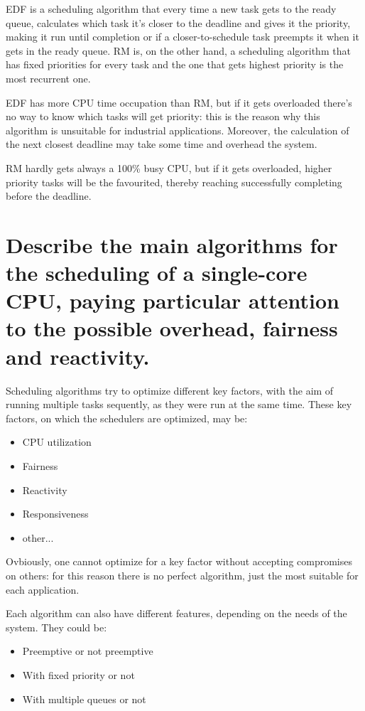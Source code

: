 EDF is a scheduling algorithm that every time a new task gets to the ready queue, calculates which task it's closer to the deadline and gives it the priority, making it run until completion or if a closer-to-schedule task preempts it when it gets in the ready queue. 
RM is, on the other hand, a scheduling algorithm that has fixed priorities for every task and the one that gets highest priority is the most recurrent one.

EDF has more CPU time occupation than RM, but if it gets overloaded there's no way to know which tasks will get priority: this is the reason why this algorithm is unsuitable for industrial applications. Moreover, the calculation of the next closest deadline may take some time and overhead the system.

RM hardly gets always a 100\% busy CPU, but if it gets overloaded, higher priority tasks will be the favourited, thereby reaching successfully completing before the deadline.

\section{Describe the main algorithms for the scheduling of a single-core CPU, paying particular attention to the possible overhead, fairness and reactivity.}

Scheduling algorithms try to optimize different key factors, with the aim of running multiple tasks sequently, as they were run at the same time.
These key factors, on which the schedulers are optimized, may be:
\begin{itemize}
	\item CPU utilization
	\item Fairness
	\item Reactivity
	\item Responsiveness
	\item other...
\end{itemize}

Ovbiously, one cannot optimize for a key factor without accepting compromises on others: for this reason there is no perfect algorithm, just the most suitable for each application.

Each algorithm can also have different features, depending on the needs of the system. They could be:
\begin{itemize}
	\item Preemptive or not preemptive
	\item With fixed priority or not
	\item With multiple queues or not
\end{itemize}

